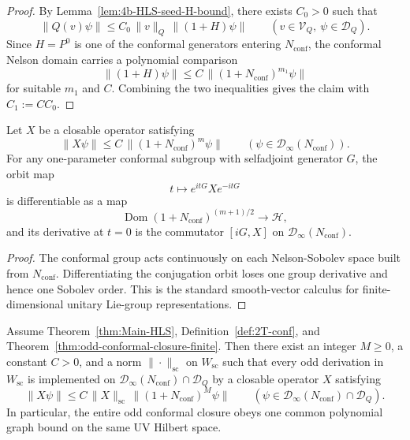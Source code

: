 \begin{proof}
By Lemma~\ref{lem:4b-HLS-seed-H-bound}, there exists \(C_0>0\) such that
\[
\|Q(v)\psi\|
\le
C_0\,\|v\|_Q\,\|(1+H)\psi\|
\qquad
(v\in\mathcal V_Q,\ \psi\in\mathcal D_Q).
\]
Since \(H=P^0\) is one of the conformal generators entering \(N_{\mathrm{conf}}\),
the conformal Nelson domain carries a polynomial comparison
\[
  \|(1+H)\psi\|
  \leq
  C\,\|(1+N_{\mathrm{conf}})^{m_1}\psi\|
\]
for suitable \(m_1\) and \(C\). Combining the two inequalities gives the claim
with \(C_1:=CC_0\).
\end{proof}

\begin{lemma}
\label{lem:4b-one-conformal-derivative}
Let \(X\) be a closable operator satisfying
\[
\|X\psi\|
\leq
C\,\|(1+N_{\mathrm{conf}})^m\psi\|
\qquad
(\psi\in\mathcal D_\infty(N_{\mathrm{conf}})).
\]
For any one-parameter conformal subgroup with selfadjoint generator \(G\), the
orbit map
\[
t\longmapsto e^{itG}Xe^{-itG}
\]
is differentiable as a map
\[
\operatorname{Dom}(1+N_{\mathrm{conf}})^{(m+1)/2}\longrightarrow\mathcal H,
\]
and its derivative at \(t=0\) is the commutator \([iG,X]\) on
\(\mathcal D_\infty(N_{\mathrm{conf}})\).
\end{lemma}

\begin{proof}
The conformal group acts continuously on each Nelson-Sobolev space built from
\(N_{\mathrm{conf}}\). Differentiating the conjugation orbit loses one group
derivative and hence one Sobolev order. This is the standard smooth-vector
calculus for finite-dimensional unitary Lie-group representations.
\end{proof}

\begin{theorem}
\label{thm:conformal-orbit-uniform-energy-bounds}
Assume Theorem~\ref{thm:Main-HLS},
Definition~\ref{def:2T-conf}, and
Theorem~\ref{thm:odd-conformal-closure-finite}.
Then there exist an integer \(M\geq 0\), a constant \(C>0\), and a norm
\(\|\cdot\|_{\mathrm{sc}}\) on \(W_{\mathrm{sc}}\) such that every odd derivation
in \(W_{\mathrm{sc}}\) is implemented on
\(\mathcal D_\infty(N_{\mathrm{conf}})\cap\mathcal D_Q\) by a closable operator
\(X\) satisfying
\[
\|X\psi\|
\le
C\,\|X\|_{\mathrm{sc}}\,\|(1+N_{\mathrm{conf}})^M\psi\|
\qquad
(\psi\in\mathcal D_\infty(N_{\mathrm{conf}})\cap\mathcal D_Q).
\]
In particular, the entire odd conformal closure obeys one common polynomial graph
bound on the same UV Hilbert space.
\end{theorem}

